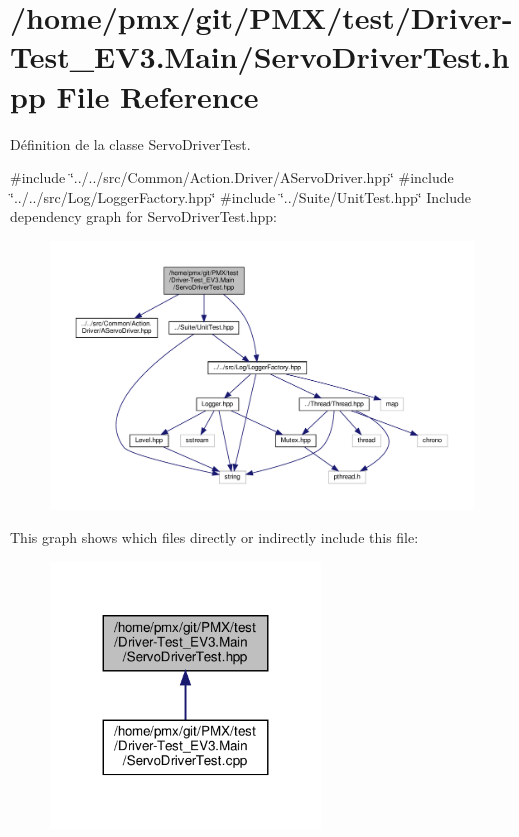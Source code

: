 \hypertarget{Driver-Test__EV3_8Main_2ServoDriverTest_8hpp}{}\section{/home/pmx/git/\+P\+M\+X/test/\+Driver-\/\+Test\+\_\+\+E\+V3.Main/\+Servo\+Driver\+Test.hpp File Reference}
\label{Driver-Test__EV3_8Main_2ServoDriverTest_8hpp}


Définition de la classe Servo\+Driver\+Test.  


{\ttfamily \#include \char`\"{}../../src/\+Common/\+Action.\+Driver/\+A\+Servo\+Driver.\+hpp\char`\"{}}\newline
{\ttfamily \#include \char`\"{}../../src/\+Log/\+Logger\+Factory.\+hpp\char`\"{}}\newline
{\ttfamily \#include \char`\"{}../\+Suite/\+Unit\+Test.\+hpp\char`\"{}}\newline
Include dependency graph for Servo\+Driver\+Test.\+hpp\+:
\nopagebreak
\begin{figure}[H]
\begin{center}
\leavevmode
\includegraphics[width=350pt]{Driver-Test__EV3_8Main_2ServoDriverTest_8hpp__incl}
\end{center}
\end{figure}
This graph shows which files directly or indirectly include this file\+:
\nopagebreak
\begin{figure}[H]
\begin{center}
\leavevmode
\includegraphics[width=203pt]{Driver-Test__EV3_8Main_2ServoDriverTest_8hpp__dep__incl}
\end{center}
\end{figure}
